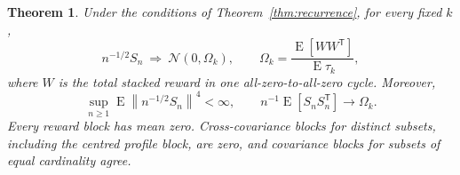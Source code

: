 \documentclass[12pt,a4paper]{article}
\newtheorem{theorem}{Theorem}
\theoremstyle{definition}
\theoremstyle{remark}\newtheorem{remark}{Remark}
\numberwithin{equation}{section}
\newcommand{\E}{\operatorname{E}}
\newcommand{\norm}[1]{\left\lVert#1\right\rVert}
\newcommand{\trans}{^{\mathsf T}}
\begin{document}
\begin{theorem}\label{thm:clt}\label{lem:supp-label-flip}
Under the conditions of Theorem~\ref{thm:recurrence}, for every fixed $k$,
\begin{equation}\label{eq:joint-clt}
 n^{-1/2}S_n\ \Rightarrow\ \mathcal N(0,\Omega_k),\qquad
 \Omega_k=\frac{\E[WW\trans]}{\E\tau_k},
\end{equation}
where $W$ is the total stacked reward in one all-zero-to-all-zero cycle. Moreover,
\begin{equation}\label{eq:fourth}
 \sup_{n\ge1}\E\norm{n^{-1/2}S_n}^4<\infty,
 \qquad n^{-1}\E[S_nS_n\trans]\longrightarrow\Omega_k.
\end{equation}
Every reward block has mean zero. Cross-covariance blocks for distinct subsets, including the centred profile block, are zero, and covariance blocks for subsets of equal cardinality agree.
\end{theorem}
\end{document}
